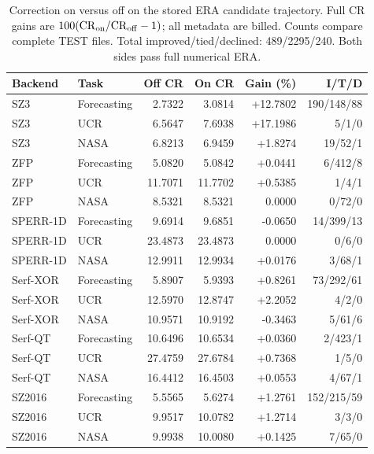 \begin{table}[t]
\centering
\small
\setlength{\tabcolsep}{5pt}
\caption{Correction on versus off on the stored ERA candidate trajectory. Full CR gains are $100(\mathrm{CR}_{\rm on}/\mathrm{CR}_{\rm off}-1)$; all metadata are billed. Counts compare complete TEST files. Total improved/tied/declined: 489/2295/240. Both sides pass full numerical ERA.}
\label{tab:s-ablation-correction-cr}
\begin{tabular}{@{}llrrrr@{}}
\toprule
Backend & Task & Off CR & On CR & Gain (\%) & I/T/D \\
\midrule
SZ3 & Forecasting & 2.7322 & 3.0814 & +12.7802 & 190/148/88 \\
SZ3 & UCR & 6.5647 & 7.6938 & +17.1986 & 5/1/0 \\
SZ3 & NASA & 6.8213 & 6.9459 & +1.8274 & 19/52/1 \\
ZFP & Forecasting & 5.0820 & 5.0842 & +0.0441 & 6/412/8 \\
ZFP & UCR & 11.7071 & 11.7702 & +0.5385 & 1/4/1 \\
ZFP & NASA & 8.5321 & 8.5321 & 0.0000 & 0/72/0 \\
SPERR-1D & Forecasting & 9.6914 & 9.6851 & -0.0650 & 14/399/13 \\
SPERR-1D & UCR & 23.4873 & 23.4873 & 0.0000 & 0/6/0 \\
SPERR-1D & NASA & 12.9911 & 12.9934 & +0.0176 & 3/68/1 \\
Serf-XOR & Forecasting & 5.8907 & 5.9393 & +0.8261 & 73/292/61 \\
Serf-XOR & UCR & 12.5970 & 12.8747 & +2.2052 & 4/2/0 \\
Serf-XOR & NASA & 10.9571 & 10.9192 & -0.3463 & 5/61/6 \\
Serf-QT & Forecasting & 10.6496 & 10.6534 & +0.0360 & 2/423/1 \\
Serf-QT & UCR & 27.4759 & 27.6784 & +0.7368 & 1/5/0 \\
Serf-QT & NASA & 16.4412 & 16.4503 & +0.0553 & 4/67/1 \\
SZ2016 & Forecasting & 5.5565 & 5.6274 & +1.2761 & 152/215/59 \\
SZ2016 & UCR & 9.9517 & 10.0782 & +1.2714 & 3/3/0 \\
SZ2016 & NASA & 9.9938 & 10.0080 & +0.1425 & 7/65/0 \\
\bottomrule
\end{tabular}
\end{table}


